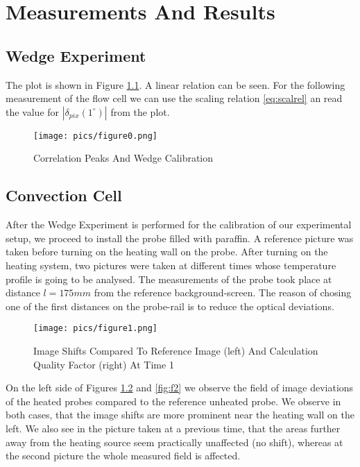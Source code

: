 \chapter{Measurements And Results}\label{sec:results}

\section{Wedge Experiment}
The plot is shown in Figure \ref{fig:f0}. A linear relation can be seen. For the following measurement of the flow cell we can use the scaling relation \ref{eq:scalrel} an read the value for $\left | \delta_{pix} (1^\circ) \right |$ 
from the plot.

\begin{figure}[H]
\centering
\texttt{[image: pics/figure0.png]}
\caption{Correlation Peaks And Wedge Calibration}
\label{fig:f0}
\end{figure}



\section{Convection Cell}

After the Wedge Experiment is performed for the calibration of our experimental setup, we proceed to install the probe filled with paraffin. A reference picture was taken before turning on the heating wall on the probe. After turning on the heating system, two pictures were taken at different times whose temperature profile is going to be analysed. The measurements of the probe took place at distance $l = 175 mm $ from the reference background-screen. The reason of chosing one of the first distances on the probe-rail is to reduce the optical deviations.

\begin{figure}[H]
\centering
\texttt{[image: pics/figure1.png]}
\caption{Image Shifts Compared To Reference Image (left) And Calculation Quality Factor (right) At Time 1}
\label{fig:f1}
\end{figure}

On the left side of Figures \ref{fig:f1} and \ref{fig:f2} we observe the field of image deviations of the heated probes compared to the reference unheated probe. We observe in both cases, that the image shifts are more prominent near the heating wall on the left. We also see in the picture taken at a previous time, that the areas further away from the heating source seem practically unaffected (no shift), whereas at the second picture the whole measured field is affected.

